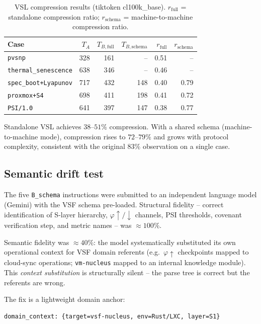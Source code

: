 \documentclass[11pt, a4paper]{article}
\begin{document}
\begin{table}[h]
\centering
\caption{VSL compression results (tiktoken cl100k\_base).
  $r_\text{full}$ = standalone compression ratio;
  $r_\text{schema}$ = machine-to-machine compression ratio.}
\label{tab:vsl}
\begin{tabular}{lrrrrr}
\hline
Case & $T_A$ & $T_{B,\text{full}}$ & $T_{B,\text{schema}}$
     & $r_\text{full}$ & $r_\text{schema}$ \\
\hline
\texttt{pvsnp}               & 328 & 161 &  --  & 0.51 &  --  \\
\texttt{thermal\_senescence} & 638 & 346 &  --  & 0.46 &  --  \\
\texttt{spec\_boot+Lyapunov} & 717 & 432 & 148  & 0.40 & 0.79 \\
\texttt{proxmox+S4}          & 698 & 411 & 198  & 0.41 & 0.72 \\
\texttt{PSI/1.0}             & 641 & 397 & 147  & 0.38 & 0.77 \\
\hline
\end{tabular}
\end{table}

Standalone VSL achieves $38$--$51\%$ compression.
With a shared schema (machine-to-machine mode), compression rises to
$72$--$79\%$ and grows with protocol complexity, consistent with the
original $83\%$ observation on a single case.

\subsection{Semantic drift test}

The five \texttt{B\_schema} instructions were submitted to an independent
language model (Gemini) with the VSF schema pre-loaded.
Structural fidelity -- correct identification of S-layer hierarchy,
$\varphi\!\uparrow/\!\downarrow$ channels, PSI thresholds, covenant
verification step, and metric names -- was $\approx 100\%$.

Semantic fidelity was $\approx 40\%$: the model systematically substituted
its own operational context for VSF domain referents
(e.g.\ $\varphi\!\uparrow$ checkpoints mapped to cloud-sync operations;
\texttt{vm-nucleus} mapped to an internal knowledge module).
This \emph{context substitution} is structurally silent -- the parse tree
is correct but the referents are wrong.

The fix is a lightweight domain anchor:

\begin{verbatim}
domain_context: {target=vsf-nucleus, env=Rust/LXC, layer=S1}
\end{verbatim}
\end{document}
